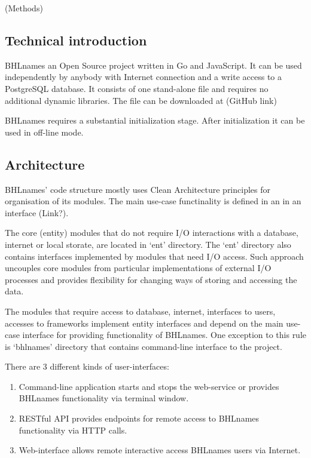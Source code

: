 \documentclass[
]{article}
\begin{document}
(Methods)

\hypertarget{technical-introduction}{%
\subsection{Technical introduction}\label{technical-introduction}}

BHLnames an Open Source project written in Go and JavaScript. It can be
used independently by anybody with Internet connection and a write
access to a PostgreSQL database. It consists of one stand-alone file and
requires no additional dynamic libraries. The file can be downloaded at
(GitHub link)

BHLnames requires a substantial initialization stage. After
initialization it can be used in off-line mode.

\hypertarget{architecture}{%
\subsection{Architecture}\label{architecture}}

BHLnames' code structure mostly uses Clean Architecture principles for
organisation of its modules. The main use-case functinality is defined
in an in an interface (Link?).

The core (entity) modules that do not require I/O interactions with a
database, internet or local storate, are located in `ent' directory. The
`ent' directory also contains interfaces implemented by modules that
need I/O access. Such approach uncouples core modules from particular
implementations of external I/O processes and provides flexibility for
changing ways of storing and accessing the data.

The modules that require access to database, internet, interfaces to
users, accesses to frameworks implement entity interfaces and depend on
the main use-case interface for providing functionality of BHLnames. One
exception to this rule is `bhlnames' directory that contains
command-line interface to the project.

There are 3 different kinds of user-interfaces:

\begin{enumerate}
\def\labelenumi{\arabic{enumi}.}
\item
  Command-line application starts and stops the web-service or provides
  BHLnames functionality via terminal window.
\item
  RESTful API provides endpoints for remote access to BHLnames
  functionality via HTTP calls.
\item
  Web-interface allows remote interactive access BHLnames users via
  Internet.
\end{enumerate}
\end{document}
